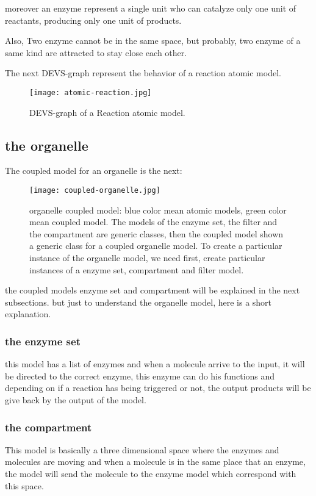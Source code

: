 \documentclass[12pt]{article}
\begin{document}
moreover an enzyme represent a single unit who can catalyze only one unit of reactants, producing only one unit of products. 

Also, Two enzyme cannot be in the same space, but probably, two enzyme of a same kind are attracted to stay close each other.

\newpage
The next DEVS-graph represent the behavior of a reaction atomic model.

\begin{figure}[h!]
 \centering
  \texttt{[image: atomic-reaction.jpg]}
 \caption{DEVS-graph of a Reaction atomic model.}
\end{figure}

\newpage
\subsection*{the organelle}

The coupled model for an organelle is the next:

\begin{figure}[h!]
 \centering
  \texttt{[image: coupled-organelle.jpg]}
 \caption{organelle coupled model: blue color mean atomic models, green color mean coupled model. The models of the enzyme set, the filter and the compartment are generic classes, then the coupled model shown a generic class for a coupled organelle model. To create a particular instance of the organelle model, we need first, create particular instances of a enzyme set, compartment and filter model.}
\end{figure}

the coupled models enzyme set and compartment will be explained in the next subsections. but just to understand the organelle model, here is a short explanation.

\subsubsection*{the enzyme set}
this model has a list of enzymes and when a molecule arrive to the input, it will be directed to the correct enzyme, this enzyme can do his functions and depending on if a reaction has being triggered or not, the output products will be give back by the output of the model.

\subsubsection*{the compartment}
This model is basically a three dimensional space where the enzymes and molecules are moving and when a molecule is in the same place that an enzyme, the model will send the molecule to the enzyme model which correspond with this space.
\end{document}
